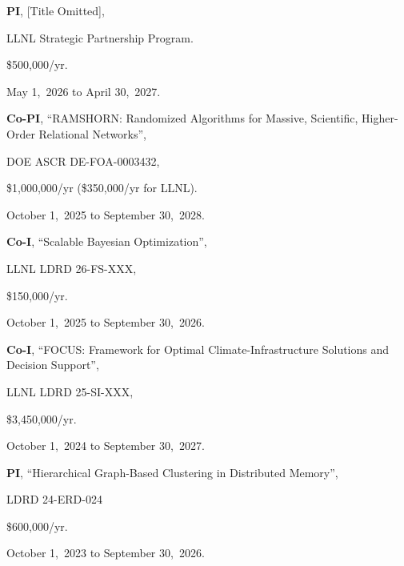 \begin{innerlist}

  \item[] \textbf{PI},
  [Title Omitted],
  \begin{innerlist}
    \item[-] LLNL Strategic Partnership Program.
    \item[-] \$500,000/yr.
    \item[-] May 1,~2026 to April 30,~2027.
  \end{innerlist}

  \item[] \textbf{Co-PI},
    ``RAMSHORN: Randomized Algorithms for Massive, Scientific, Higher-Order Relational Networks'',
  \begin{innerlist}
    \item[-] DOE ASCR DE-FOA-0003432,
    \item[-] \$1,000,000/yr (\$350,000/yr for LLNL).
    \item[-] October 1,~2025 to September 30,~2028.
  \end{innerlist}

  \item[] \textbf{Co-I},
    ``Scalable Bayesian Optimization'',
  \begin{innerlist}
    \item[-] LLNL LDRD 26-FS-XXX,
    \item[-] \$150,000/yr.
    \item[-] October 1,~2025 to September 30,~2026.
  \end{innerlist}

  \item[] \textbf{Co-I},
    ``FOCUS: Framework for Optimal Climate-Infrastructure Solutions and Decision Support'',
  \begin{innerlist}
    \item[-] LLNL LDRD 25-SI-XXX,
    \item[-] \$3,450,000/yr.
    \item[-] October 1,~2024 to September 30,~2027.
  \end{innerlist}

  \item[] \textbf{PI},
  ``Hierarchical Graph-Based Clustering in Distributed Memory'',
  \begin{innerlist}
    \item[-] LDRD 24-ERD-024
    \item[-] \$600,000/yr.
    \item[-] October 1,~2023 to September 30,~2026.
  \end{innerlist}


\end{innerlist}
